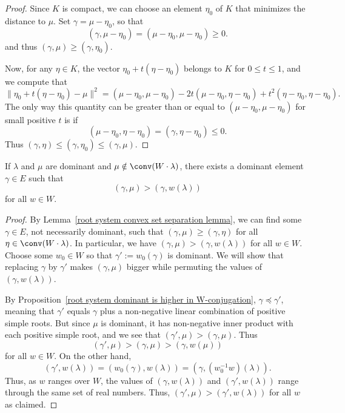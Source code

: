 \begin{proof}
Since $K$ is compact, we can choose an element $\eta_0$ of $K$ that minimizes the distance to $\mu$. Set $\gamma=\mu-\eta_0$, so that
\[(\gamma,\mu-\eta_0)=(\mu-\eta_0,\mu-\eta_0)\geq 0.\]
and thus $(\gamma,\mu)\geq(\gamma,\eta_0)$.\par
Now, for any $\eta\in K$, the vector $\eta_0+t(\eta-\eta_0)$ belongs to $K$ for $0\leq t\leq 1$, and we compute that
\[\|\eta_0+t(\eta-\eta_0)-\mu\|^2=(\mu-\eta_0,\mu-\eta_0)-2t(\mu-\eta_0,\eta-\eta_0)+t^2(\eta-\eta_0,\eta-\eta_0).\]
The only way this quantity can be greater than or equal to $(\mu-\eta_0,\mu-\eta_0)$ for small positive $t$ is if
\[(\mu-\eta_0,\eta-\eta_0)=(\gamma,\eta-\eta_0)\leq 0.\]
Thus $(\gamma,\eta)\leq(\gamma,\eta_0)\leq(\gamma,\mu)$.
\end{proof}
\begin{lemma}\label{root system dominant not in convex hull lemma}
If $\lambda$ and $\mu$ are dominant and $\mu\notin\conv(W\cdot\lambda)$, there exists a dominant element $\gamma\in E$ such that
\[(\gamma,\mu)>(\gamma,w(\lambda))\]
for all $w\in W$.
\end{lemma}
\begin{proof}
By Lemma~\ref{root system convex set separation lemma}, we can find some $\gamma\in E$, not necessarily dominant, such that $(\gamma,\mu)\geq(\gamma,\eta)$ for all $\eta\in\conv(W\cdot\lambda)$. In particular, we have $(\gamma,\mu)>(\gamma,w(\lambda))$ for all $w\in W$. Choose some $w_0\in W$ so that $\gamma':=w_0(\gamma)$ is dominant. We will show that replacing $\gamma$ by $\gamma'$ makes $(\gamma,\mu)$ bigger while permuting the values of $(\gamma,w(\lambda))$.\par
By Proposition~\ref{root system dominant is higher in W-conjugation}, $\gamma\preceq\gamma'$, meaning that $\gamma'$ equals $\gamma$ plus a non-negative linear combination of positive simple roots. But since $\mu$ is dominant, it has non-negative inner product with each positive simple root, and we see that $(\gamma',\mu)>(\gamma,\mu)$. Thus
\[(\gamma',\mu)>(\gamma,\mu)>(\gamma,w(\mu))\]
for all $w\in W$. On the other hand,
\[(\gamma',w(\lambda))=(w_0(\gamma),w(\lambda))=(\gamma,(w_0^{-1}w)(\lambda)).\]
Thus, as $w$ ranges over $W$, the values of $(\gamma,w(\lambda))$ and $(\gamma',w(\lambda))$ range through the same set of real numbers. Thus, $(\gamma',\mu)>(\gamma',w(\lambda))$ for all $w$ as claimed.
\end{proof}
